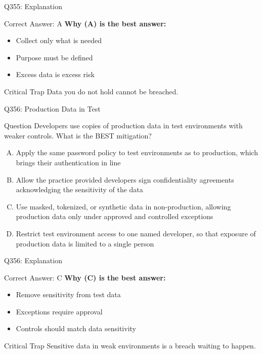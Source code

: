 \documentclass{beamer}
\begin{document}
	\begin{frame}{Q355: Explanation}
		\begin{block}{Correct Answer: A}
			\textbf{Why (A) is the best answer:}
			\begin{itemize}
				\item Collect only what is needed
				\item Purpose must be defined
				\item Excess data is excess risk
			\end{itemize}
		\end{block}
		\begin{alertblock}{Critical Trap}
			Data you do not hold cannot be breached.
		\end{alertblock}
	\end{frame}
	
	\begin{frame}{Q356: Production Data in Test}
		\begin{block}{Question}
			\small Developers use copies of production data in test environments with weaker controls. What is the BEST mitigation?
		\end{block}
		\begin{enumerate}[(A)]
			\footnotesize
			\item Apply the same password policy to test environments as to production, which brings their authentication in line
			\item Allow the practice provided developers sign confidentiality agreements acknowledging the sensitivity of the data
			\item Use masked, tokenized, or synthetic data in non-production, allowing production data only under approved and controlled exceptions
			\item Restrict test environment access to one named developer, so that exposure of production data is limited to a single person
		\end{enumerate}
	\end{frame}
	
	\begin{frame}{Q356: Explanation}
		\begin{block}{Correct Answer: C}
			\textbf{Why (C) is the best answer:}
			\begin{itemize}
				\item Remove sensitivity from test data
				\item Exceptions require approval
				\item Controls should match data sensitivity
			\end{itemize}
		\end{block}
		\begin{alertblock}{Critical Trap}
			Sensitive data in weak environments is a breach waiting to happen.
		\end{alertblock}
	\end{frame}
	
\end{document}

